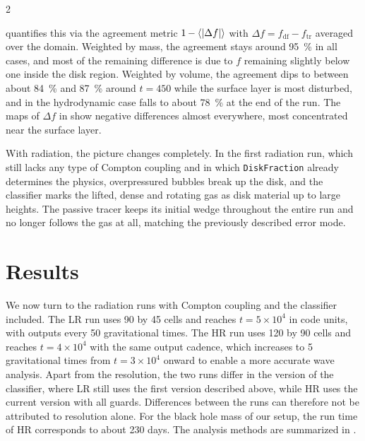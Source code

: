 \begin{multicols}{2}

	 quantifies this via the agreement metric $1 \kern-0.5pt - \langle\lvert\Delta f\rvert\rangle$ with
	$\Delta f = f_\mathrm{df} - f_\mathrm{tr}$ averaged over the domain. Weighted by mass, the agreement stays around
	\qty{95}{\percent} in all cases, and most of the remaining difference is due to $f$ remaining slightly below one
	inside the disk region. Weighted by volume, the agreement dips to between about \qty{84}{\percent} and \qty{87}{\percent} around
	$t = 450$ while the surface layer is most disturbed, and in the hydrodynamic case falls to about \qty{78}{\percent} at the
	end of the run. The maps of $\Delta f$ in  show negative differences almost everywhere, most concentrated
	near the surface layer.


	With radiation, the picture changes completely. In the first radiation run, which still lacks any type of Compton coupling and
	in which \texttt{DiskFraction} already determines the physics, overpressured bubbles break up the disk, and the classifier marks
	the lifted, dense and rotating gas as disk material up to large heights. The passive tracer keeps its initial wedge throughout
	the entire run and no longer follows the gas at all, matching the previously described error mode.

	\section{Results}
	\label{sec:results}

	We now turn to the radiation runs with Compton coupling and the classifier included. The LR run uses \num{90} by \num{45} cells and
	reaches $t = 5 \times 10^4$ in code units, with outputs every \num{50} gravitational times. The HR run uses \num{120}
	by \num{90} cells and reaches $t = 4 \times 10^4$ with the same output cadence, which increases to \num{5} gravitational
	times from $t = 3 \times 10^4$ onward to enable a more accurate wave analysis. Apart from the resolution, the two runs differ
	in the version of the classifier, where LR still uses the first version described above, while HR uses the current version with
	all guards. Differences between the runs can therefore not be attributed to resolution alone. For the black hole mass of our setup,
	the run time of HR corresponds to about \num{230} days. The analysis methods are summarized in .


\end{multicols}
